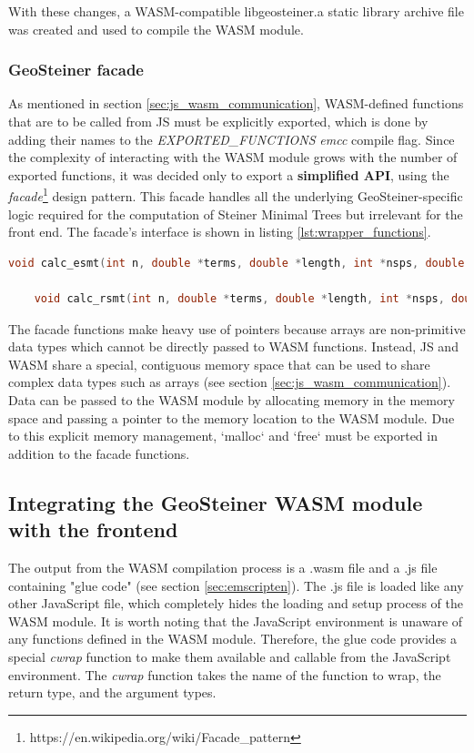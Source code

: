\documentclass{l4proj}
\begin{document}
With these changes, a WASM-compatible libgeosteiner.a static library archive file was created and used to compile the WASM module.

\subsubsection{GeoSteiner facade}
As mentioned in section \ref{sec:js_wasm_communication}, WASM-defined functions that are to be called from JS must be explicitly exported, which is done by adding their names to the \textit{EXPORTED\_FUNCTIONS} \textit{emcc} compile flag.
Since the complexity of interacting with the WASM module grows with the number of exported functions, it was decided only to export a \textbf{simplified API}, using the \textit{facade}\footnote{https://en.wikipedia.org/wiki/Facade\_pattern} design pattern. This facade handles all the underlying GeoSteiner-specific logic required for the computation of Steiner Minimal Trees but irrelevant for the front end. The facade's interface is shown in listing \ref{lst:wrapper_functions}.

\begin{lstlisting}[language=C,caption=Wrapper functions for the GeoSteiner library,label=lst:wrapper_functions]
    void calc_esmt(int n, double *terms, double *length, int *nsps, double *sps, int *nedges, int *edges);

    void calc_rsmt(int n, double *terms, double *length, int *nsps, double *sps, int *nedges, int *edges);
\end{lstlisting}

The facade functions make heavy use of pointers because arrays are non-primitive data types which cannot be directly passed to WASM functions. Instead, JS and WASM share a special, contiguous memory space that can be used to share complex data types such as arrays (see section \ref{sec:js_wasm_communication}). Data can be passed to the WASM module by allocating memory in the memory space and passing a pointer to the memory location to the WASM module. Due to this explicit memory management, `malloc` and `free` must be exported in addition to the facade functions.

\subsection{Integrating the GeoSteiner WASM module with the frontend}
The output from the WASM compilation process is a .wasm file and a .js file containing "glue code" (see section \ref{sec:emscripten}). The .js file is loaded like any other JavaScript file, which completely hides the loading and setup process of the WASM module.
It is worth noting that the JavaScript environment is unaware of any functions defined in the WASM module. Therefore, the glue code provides a special \textit{cwrap} function to make them available and callable from the JavaScript environment. The \textit{cwrap} function takes the name of the function to wrap, the return type, and the argument types.
\end{document}
